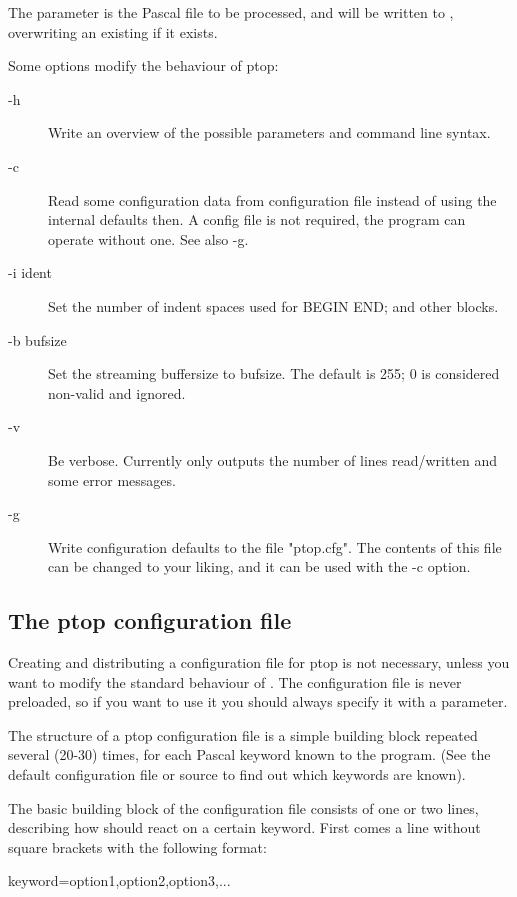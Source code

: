 The  parameter is the Pascal file to be processed, and will be written
to , overwriting an existing  if it exists.

Some options modify the behaviour of ptop:

\begin{description}
\item[-h] Write an overview of the possible parameters and command line syntax.
\item[-c ] Read some configuration data from configuration file instead of using
  the internal defaults then. A config file is not required, the program can
  operate without one. See also -g.
\item[-i ident] Set the number of indent spaces used for BEGIN END; and other blocks.
\item[-b bufsize] Set the streaming buffersize to bufsize. The default is 255; 
0 is considered non-valid and ignored.
\item[-v] Be verbose. Currently only outputs the number of lines read/written and some error messages.
\item[-g ] Write  configuration defaults to the file
"ptop.cfg". The contents of this file can be changed to your liking, and it
can be used with the -c option.
\end{description}

\subsection{The ptop configuration file}

Creating and distributing a configuration file for ptop is not necessary,
unless you want to modify the standard behaviour of . The configuration
file is never preloaded, so if you want to use it you should always specify
it with a  parameter.

The structure of a ptop configuration file is a simple building block repeated
several (20-30) times, for each Pascal keyword known to the  program.
(See the default configuration file or  source to
find out which keywords are known).

The basic building block of the configuration file consists of one or two
lines, describing how  should react on a certain keyword.
First comes a line without square brackets with the following format:

keyword=option1,option2,option3,...

